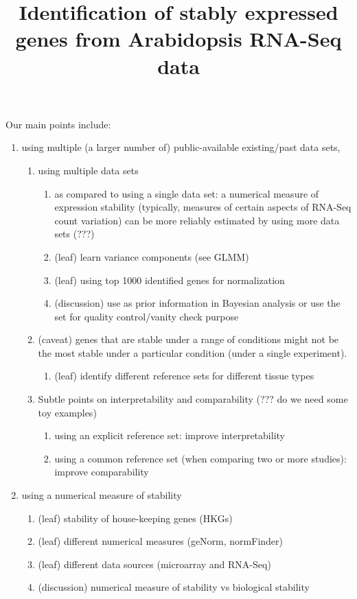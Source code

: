 \documentclass[11pt, a4paper]{article}
\title{Identification of stably expressed genes from Arabidopsis RNA-Seq data}
\date{} %
\begin{document}
Our main points include: 
\begin{enumerate}
    \item using multiple (a larger number of) public-available existing/past data sets, 
	\begin{enumerate}
	    \item
		using multiple data sets 
		\begin{enumerate}
		    \item
			as compared to using a single data set: a numerical
			measure of expression stability (typically, measures
			of certain aspects of RNA-Seq count variation) can be
			more reliably estimated by using more data sets (???)
		    \item
			(leaf) learn variance components (see GLMM)
		    \item
			(leaf) using top 1000 identified genes for
			normalization
		    \item
			(discussion) use as prior information in Bayesian analysis or
			use the  set for quality control/vanity check purpose
		\end{enumerate}
	    \item
		(caveat) genes that are stable under a range of conditions
		might not be the most stable under a particular condition
		(under a single experiment).
		\begin{enumerate}
		    \item
			(leaf) identify different reference sets for different tissue
			types
		\end{enumerate}

	    \item Subtle points on interpretability and comparability (??? do
		we need some toy examples)

		\begin{enumerate}
		    \item
			using an explicit reference set: improve interpretability
		    \item
			using a common reference set (when comparing two or more studies): improve comparability
		\end{enumerate}
	\end{enumerate}

    \item
	using a numerical measure of stability
	\begin{enumerate}
	    \item
		(leaf) stability of house-keeping genes (HKGs)
	    \item
		(leaf) different numerical measures (geNorm, normFinder)
	    \item
		(leaf) different data sources (microarray and RNA-Seq)
	    \item
		(discussion) numerical measure of stability vs biological
		stability 
	\end{enumerate}



\end{enumerate}
\end{document}

